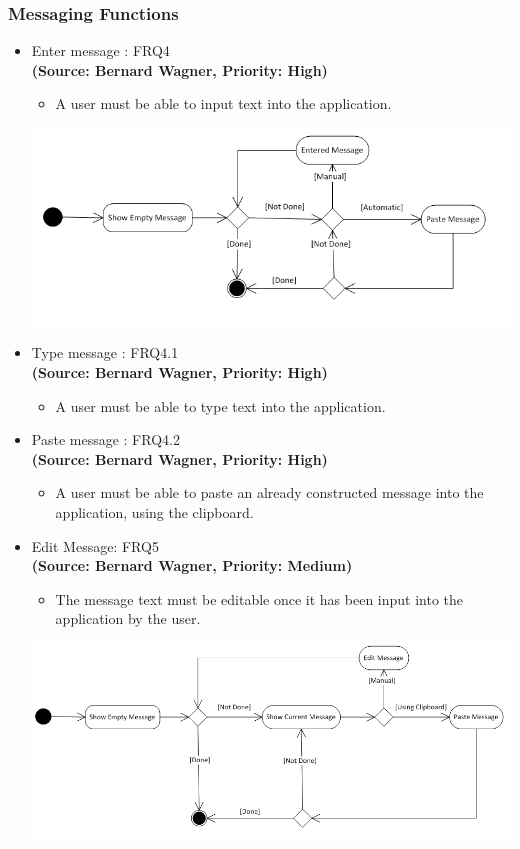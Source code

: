 \subsubsection{Messaging Functions}
\begin{itemize}
\item{Enter message : FRQ4}\\%
\textbf{(Source: Bernard Wagner, Priority: High)}
\begin{itemize}
\item A user must be able to input text into the application.
\end{itemize}
 \includegraphics[width=13cm]{diagrams/StateDiagrams/EnterMessageState.png}
\item{Type message : FRQ4.1}\\
\textbf{(Source: Bernard Wagner, Priority: High)}
\begin{itemize}
\item A user must be able to type text into the application.
\end{itemize}
\item{Paste message : FRQ4.2}\\
\textbf{(Source: Bernard Wagner, Priority: High)}
\begin{itemize}
\item A user must be able to paste an already constructed message into the application, using the clipboard.
\end{itemize}
\item{Edit Message: FRQ5}\\
\textbf{(Source: Bernard Wagner, Priority: Medium)}
\begin{itemize}
\item The message text must be editable once it has been input into the application by the user.
\end{itemize}
 \includegraphics[width=13cm]{diagrams/StateDiagrams/EditMessageState.png}

\end{itemize}
